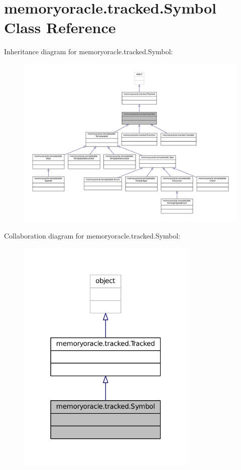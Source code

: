 \hypertarget{classmemoryoracle_1_1tracked_1_1Symbol}{}\section{memoryoracle.\+tracked.\+Symbol Class Reference}
\label{classmemoryoracle_1_1tracked_1_1Symbol}


Inheritance diagram for memoryoracle.\+tracked.\+Symbol\+:
\nopagebreak
\begin{figure}[H]
\begin{center}
\leavevmode
\includegraphics[width=350pt]{classmemoryoracle_1_1tracked_1_1Symbol__inherit__graph}
\end{center}
\end{figure}


Collaboration diagram for memoryoracle.\+tracked.\+Symbol\+:\nopagebreak
\begin{figure}[H]
\begin{center}
\leavevmode
\includegraphics[width=244pt]{classmemoryoracle_1_1tracked_1_1Symbol__coll__graph}
\end{center}
\end{figure}


